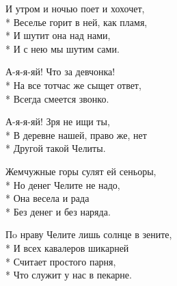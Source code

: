 \medskip

\begin{minipage}{\linewidth}
И утром и ночью поет и хохочет,\\*
Веселье горит в ней, как пламя,\\*
И шутит она над нами,\\*
И с нею мы шутим сами.\\
\end{minipage}\par\medskip\nobreak

\medskip

\begin{minipage}{\linewidth}
\hspace*{1.5em}А-я-я-яй! Что за девчонка!\\*
\hspace*{1.5em}На все тотчас же сыщет ответ,\\*
\hspace*{1.5em}Всегда смеется звонко.\\
\end{minipage}\par\medskip\nobreak

\medskip

\begin{minipage}{\linewidth}
\hspace*{1.5em}А-я-я-яй! Зря не ищи ты,\\*
\hspace*{1.5em}В деревне нашей, право же, нет\\*
\hspace*{1.5em}Другой такой Челиты.\\
\end{minipage}\par\medskip\nobreak

\medskip

\begin{minipage}{\linewidth}
Жемчужные горы сулят ей сеньоры,\\*
Но денег Челите не надо,\\*
Она весела и рада\\*
Без денег и без наряда.\\
\end{minipage}\par\medskip\nobreak

\medskip

\begin{minipage}{\linewidth}
Пo нраву Челите лишь солнце в зените,\\*
И всех кавалеров шикарней\\*
Считает простого парня,\\*
Что служит у нас в пекарне.\\
\end{minipage}\par\medskip\nobreak

